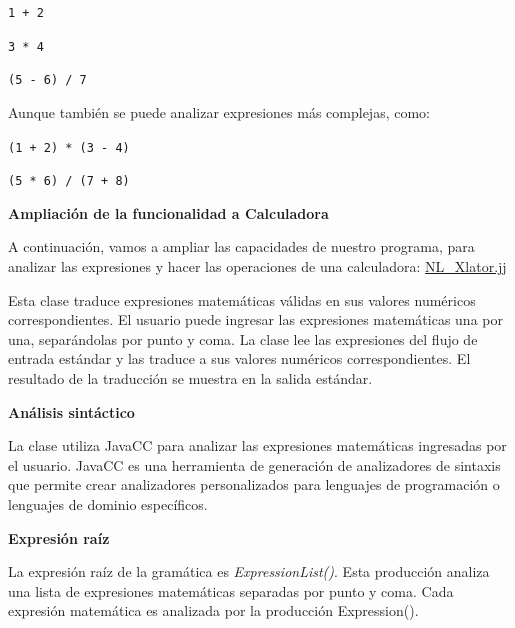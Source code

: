 \begin{center}
	\lstinline|1 + 2|

	\lstinline|3 * 4|

	\lstinline|(5 - 6) / 7|
\end{center}

Aunque también se puede analizar expresiones más complejas, como:
\begin{center}
	\lstinline|(1 + 2) * (3 - 4)|

	\lstinline|(5 * 6) / (7 + 8)|
\end{center}

\phantom{text}

\noindent \textbf{Ampliación de la funcionalidad a Calculadora}
\label{sec:ampliacioncalculadora}

\phantom{text}

\noindent A continuación, vamos a ampliar las capacidades de nuestro programa, para analizar las expresiones y hacer las operaciones de una calculadora: \hyperref[sec:nlxlator]{NL\_Xlator.jj}

%

Esta clase traduce expresiones matemáticas válidas en sus valores numéricos correspondientes. El usuario puede ingresar las expresiones matemáticas una por una, separándolas por punto y coma. La clase lee las expresiones del flujo de entrada estándar y las traduce a sus valores numéricos correspondientes. El resultado de la traducción se muestra en la salida estándar.

\phantom{text}

\noindent \textbf{Análisis sintáctico}

\phantom{text}

\noindent La clase utiliza JavaCC para analizar las expresiones matemáticas ingresadas por el usuario. JavaCC es una herramienta de generación de analizadores de sintaxis que permite crear analizadores personalizados para lenguajes de programación o lenguajes de dominio específicos.

\phantom{text}

\noindent \textbf{Expresión raíz}

\phantom{text}

\noindent La expresión raíz de la gramática es \textit{ExpressionList()}. Esta producción analiza una lista de expresiones matemáticas separadas por punto y coma. Cada expresión matemática es analizada por la producción Expression().

